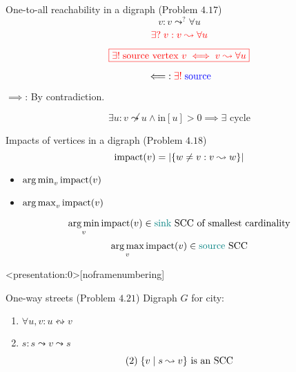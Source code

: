 \begin{frame}{}
  \begin{exampleblock}{One-to-all reachability in a digraph (Problem $4.17$)}
    \[
      v: v \leadsto^{?} \forall u
    \]
    \[
      \textcolor{red}{\exists?\; v: v \leadsto \forall u}
    \]
  \end{exampleblock}

  \pause
  \vspace{0.60cm}
  \centerline{}

  \pause
  \[
	\textcolor{red}{\boxed{\exists!\; \text{source vertex } v \iff v \leadsto \forall u}}
  \]

  \pause
  \[
    \impliedby: \textcolor{red}{\exists!}\; \textcolor{blue}{\text{source}}
  \]

  \pause
  \centerline{$\implies$: By contradiction.}
  \[
    \exists u: v \not\leadsto u \land \text{in}[u] > 0 \implies \exists \text{ cycle}
  \]
\end{frame}

\begin{frame}{}
  \begin{exampleblock}{Impacts of vertices in a digraph (Problem $4.18$)}
    \[
      \text{impact}(v) = |\{w \neq v: v \leadsto w\}|
    \]

    \begin{itemize}
      \centering
      \item $\operatorname*{arg\,min}_{v} \text{impact}(v)$
      \item $\operatorname*{arg\,max}_{v} \text{impact}(v)$
    \end{itemize}
  \end{exampleblock}

  \pause
  \[
    \operatorname*{arg\,min}_{v} \text{impact}(v) \in \text{\textcolor{teal}{sink} SCC of smallest cardinality}
  \]
  \pause
  \[
    \operatorname*{arg\,max}_{v} \text{impact}(v) \in \text{\textcolor{teal}{source} SCC}
  \]

  \pause
  \vspace{0.30cm}
  \centerline{}
\end{frame}

\begin{frame}<presentation:0>[noframenumbering]
  \begin{exampleblock}{One-way streets (Problem $4.21$)}
	Digraph $G$ for city:
    \begin{enumerate}
      \item $\forall u,v: u \leftrightsquigarrow v$
      \item $s: s \leadsto v \leadsto s$
    \end{enumerate}
  \end{exampleblock}

  \pause
  \[
	(2)\; \{v \mid s \leadsto v\} \text{ is an SCC}
  \]
\end{frame}

